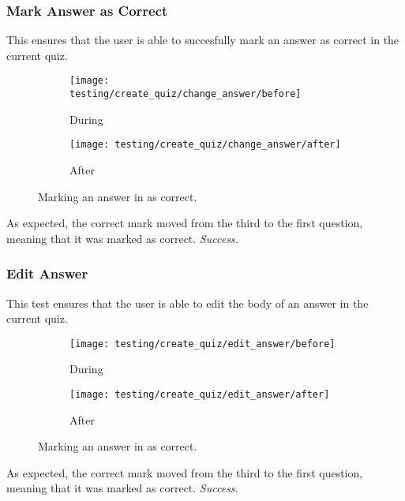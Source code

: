 \subsubsection{Mark Answer as Correct} %
\label{ssub:add_category}
This ensures that the user is able to succesfully mark an answer as correct in the current quiz.
\begin{figure}[!htbp]
\centering
\begin{subfigure}{0.5\textwidth}
  \centering
  \texttt{[image: testing/create\_quiz/change\_answer/before]}
  \caption{During}
  \label{fig:sub1}
\end{subfigure}%
\begin{subfigure}{0.5\textwidth}
  \centering
  \texttt{[image: testing/create\_quiz/change\_answer/after]}
  \caption{After}
  \label{fig:sub2}
\end{subfigure}
\caption{Marking an answer in as correct.}
\label{fig:test}
\end{figure}
As expected, the correct mark moved from the third to the first question, meaning that it was marked as correct. \textit{Success.}


\subsubsection{Edit Answer} %
\label{ssub:add_category}
This test ensures that the user is able to edit the body of an answer in the current quiz.
\begin{figure}[!htbp]
\centering
\begin{subfigure}{0.5\textwidth}
  \centering
  \texttt{[image: testing/create\_quiz/edit\_answer/before]}
  \caption{During}
  \label{fig:sub1}
\end{subfigure}%
\begin{subfigure}{0.5\textwidth}
  \centering
  \texttt{[image: testing/create\_quiz/edit\_answer/after]}
  \caption{After}
  \label{fig:sub2}
\end{subfigure}
\caption{Marking an answer in as correct.}
\label{fig:test}
\end{figure}
As expected, the correct mark moved from the third to the first question, meaning that it was marked as correct. \textit{Success.}


